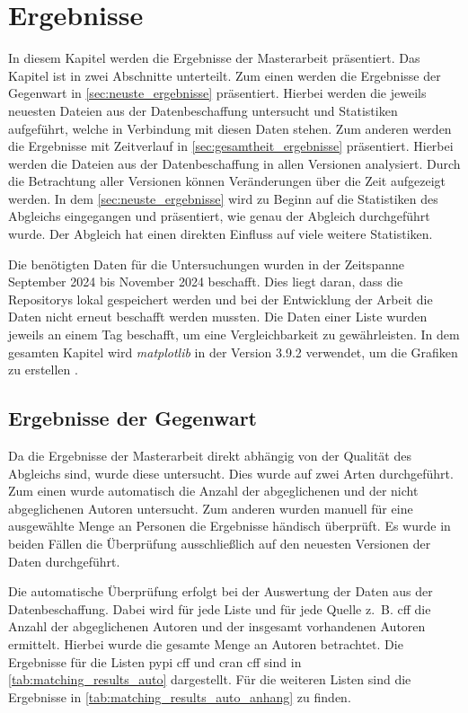 \chapter{Ergebnisse}
\label{chap:ergebnisse}
In diesem Kapitel werden die Ergebnisse der Masterarbeit präsentiert.
Das Kapitel ist in zwei Abschnitte unterteilt.
Zum einen werden die Ergebnisse der Gegenwart in \autoref{sec:neuste_ergebnisse} präsentiert.
Hierbei werden die jeweils neuesten Dateien aus der Datenbeschaffung untersucht und Statistiken aufgeführt, welche in Verbindung mit diesen Daten stehen.
Zum anderen werden die Ergebnisse mit Zeitverlauf in \autoref{sec:gesamtheit_ergebnisse} präsentiert.
Hierbei werden die Dateien aus der Datenbeschaffung in allen Versionen analysiert.
Durch die Betrachtung aller Versionen können Veränderungen über die Zeit aufgezeigt werden.
In dem \autoref{sec:neuste_ergebnisse} wird zu Beginn auf die Statistiken des Abgleichs eingegangen und präsentiert, wie genau der Abgleich durchgeführt wurde.
Der Abgleich hat einen direkten Einfluss auf viele weitere Statistiken.

Die benötigten Daten für die Untersuchungen wurden in der Zeitspanne September 2024 bis November 2024 beschafft.
Dies liegt daran, dass die Repositorys lokal gespeichert werden und bei der Entwicklung der Arbeit die Daten nicht erneut beschafft werden mussten.
Die Daten einer Liste wurden jeweils an einem Tag beschafft, um eine Vergleichbarkeit zu gewährleisten.
In dem gesamten Kapitel wird \emph{matplotlib} in der Version 3.9.2 verwendet, um die Grafiken zu erstellen \autocites{hunter_matplotlib_2007}{hunter_matplotlib_2024}.

\section{Ergebnisse der Gegenwart}
\label{sec:neuste_ergebnisse}
Da die Ergebnisse der Masterarbeit direkt abhängig von der Qualität des Abgleichs sind, wurde diese untersucht.
Dies wurde auf zwei Arten durchgeführt.
Zum einen wurde automatisch die Anzahl der abgeglichenen und der nicht abgeglichenen Autoren untersucht.
Zum anderen wurden manuell für eine ausgewählte Menge an Personen die Ergebnisse händisch überprüft.
Es wurde in beiden Fällen die Überprüfung ausschließlich auf den neuesten Versionen der Daten durchgeführt.

Die automatische Überprüfung erfolgt bei der Auswertung der Daten aus der Datenbeschaffung.
Dabei wird für jede Liste und für jede Quelle z. B. \gls{cff} die Anzahl der abgeglichenen Autoren und der insgesamt vorhandenen Autoren ermittelt.
Hierbei wurde die gesamte Menge an Autoren betrachtet.
Die Ergebnisse für die Listen \gls{pypi} \gls{cff} und \gls{cran} \gls{cff} sind in \autoref{tab:matching_results_auto} dargestellt.
Für die weiteren Listen sind die Ergebnisse in \autoref{tab:matching_results_auto_anhang} zu finden.


